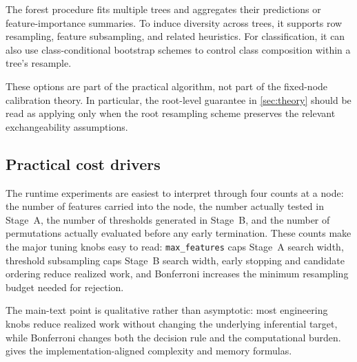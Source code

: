 The forest procedure fits multiple trees and aggregates their predictions or
feature-importance summaries. To induce diversity across trees, it supports row
resampling, feature subsampling, and related heuristics. For classification, it
can also use class-conditional bootstrap schemes to control class composition
within a tree's resample.

These options are part of the practical algorithm, not part of the fixed-node
calibration theory. In particular, the root-level guarantee in
\cref{sec:theory} should be read as applying only when the root resampling
scheme preserves the relevant exchangeability assumptions.

\subsection{Practical cost drivers}
\label{sec:complexity}

The runtime experiments are easiest to interpret through four counts at a node:
the number of features carried into the node, the number actually tested in
Stage~A, the number of thresholds generated in Stage~B, and the number of
permutations actually evaluated before any early termination. These counts make
the major tuning knobs easy to read:
\texttt{max\_features} caps Stage~A search width, threshold subsampling caps
Stage~B search width, early stopping and candidate ordering reduce realized
work, and Bonferroni increases the minimum resampling budget needed for
rejection.

The main-text point is qualitative rather than asymptotic: most engineering
knobs reduce realized work without changing the underlying inferential target,
while Bonferroni changes both the decision rule and the computational burden.
 gives the implementation-aligned complexity and
memory formulas.
